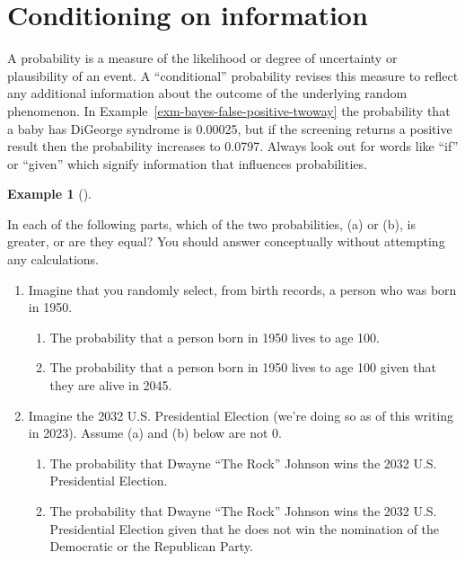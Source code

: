 \documentclass[
  letterpaper,
  DIV=11,
  numbers=noendperiod]{scrreprt}
\providecommand{\tightlist}{%
  \setlength{\itemsep}{0pt}\setlength{\parskip}{0pt}}
\theoremstyle{plain}
\theoremstyle{definition}
\newtheorem{example}{Example}[chapter]
\theoremstyle{definition}
\theoremstyle{definition}
\theoremstyle{remark}
\begin{document}
\section{Conditioning on information}\label{sec-literacy-conditioning}

A probability is a measure of the likelihood or degree of uncertainty or
plausibility of an event. A ``conditional'' probability revises this
measure to reflect any additional information about the outcome of the
underlying random phenomenon. In
Example~\ref{exm-bayes-false-positive-twoway} the probability that a
baby has DiGeorge syndrome is 0.00025, but if the screening returns a
positive result then the probability increases to 0.0797. Always look
out for words like ``if'' or ``given'' which signify information that
influences probabilities.

\begin{tcolorbox}[enhanced jigsaw, opacityback=0, left=2mm, colframe=quarto-callout-note-color-frame, toprule=.15mm, breakable, colback=white, leftrule=.75mm, arc=.35mm, rightrule=.15mm, bottomrule=.15mm]

\begin{example}[]\protect\hypertarget{exm-probability-interpret-conditional}{}\label{exm-probability-interpret-conditional}

In each of the following parts, which of the two probabilities, (a) or
(b), is greater, or are they equal? You should answer conceptually
without attempting any calculations.

\begin{enumerate}
\def\labelenumi{\arabic{enumi}.}
\item
  Imagine that you randomly select, from birth records, a person who was
  born in 1950.

  \begin{enumerate}
  \def\labelenumii{\alph{enumii}.}
  \tightlist
  \item
    The probability that a person born in 1950 lives to age 100.
  \item
    The probability that a person born in 1950 lives to age 100 given
    that they are alive in 2045.
  \end{enumerate}
\item
  Imagine the 2032 U.S. Presidential Election (we're doing so as of this
  writing in 2023). Assume (a) and (b) below are not 0.

  \begin{enumerate}
  \def\labelenumii{\alph{enumii}.}
  \tightlist
  \item
    The probability that Dwayne ``The Rock'' Johnson wins the 2032 U.S.
    Presidential Election.
  \item
    The probability that Dwayne ``The Rock'' Johnson wins the 2032 U.S.
    Presidential Election given that he does not win the nomination of
    the Democratic or the Republican Party.
  \end{enumerate}
\end{enumerate}

\end{example}

\end{tcolorbox}
\end{document}
